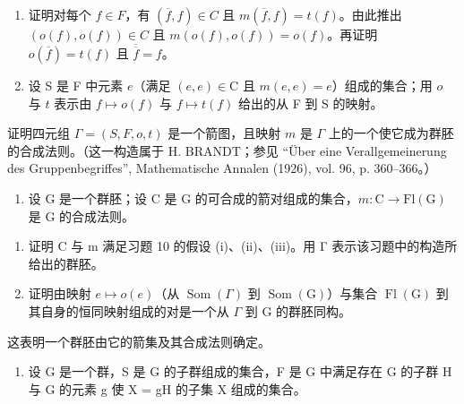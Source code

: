 \begin{enumerate}
\def\labelenumi{\alph{enumi})}
\item
  证明对每个 \(f \in F\)，有 \((\overline{f}, f) \in C\) 且 \(m(\overline{f}, f) = t(f)\)。由此推出 \((o(f), o(f)) \in C\) 且 \(m(o(f), o(f)) = o(f)\)。再证明 \(o(\overline{f}) = t(f)\) 且 \(\overline{\overline{f}} = f\)。
\item
  设 S 是 F 中元素 \(e\)（满足 \((e,e)\in\mathrm{C}\) 且 \(m(e,e)=e\)）组成的集合；用 \(o\) 与 \(t\) 表示由 \(f\mapsto o(f)\) 与 \(f\mapsto t(f)\) 给出的从 F 到 S 的映射。
\end{enumerate}

证明四元组 \(\Gamma = (S, F, o, t)\) 是一个箭图，且映射 \(m\) 是 \(\Gamma\) 上的一个使它成为群胚的合成法则。（这一构造属于 H. BRANDT；参见 “Über eine Verallgemeinerung des Gruppenbegriffes”, Mathematische Annalen (1926), vol. 96, p. 360–366。）

\begin{enumerate}
\def\labelenumi{\arabic{enumi})}
\setcounter{enumi}{10}
\tightlist
\item
  设 G 是一个群胚；设 C 是 G 的可合成的箭对组成的集合，\(m\colon\mathrm{C}\to\mathrm{Fl}(\mathrm{G})\) 是 G 的合成法则。
\end{enumerate}

\begin{enumerate}
\def\labelenumi{\alph{enumi})}
\item
  证明 C 与 m 满足习题 10 的假设 (i)、(ii)、(iii)。用 Γ 表示该习题中的构造所给出的群胚。
\item
  证明由映射 \(e \mapsto o(e)\)（从 \(\operatorname{Som}(\Gamma)\) 到 \(\operatorname{Som}(\mathrm{G})\)）与集合 \(\operatorname{Fl}(\mathrm{G})\) 到其自身的恒同映射组成的对是一个从 \(\Gamma\) 到 G 的群胚同构。
\end{enumerate}

这表明一个群胚由它的箭集及其合成法则确定。

\begin{enumerate}
\def\labelenumi{\arabic{enumi})}
\setcounter{enumi}{11}
\tightlist
\item
  设 G 是一个群，S 是 G 的子群组成的集合，F 是 G 中满足存在 G 的子群 H 与 G 的元素 g 使 X = gH 的子集 X 组成的集合。
\end{enumerate}

